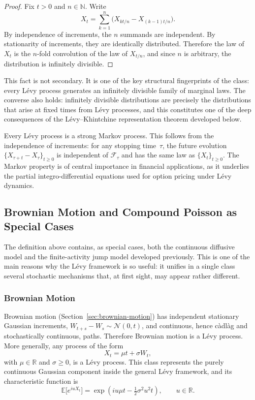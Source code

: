 \begin{proof}
Fix $t>0$ and $n\in\mathbb{N}$. Write
\[
X_t
=
\sum_{k=1}^{n}\bigl(X_{kt/n}-X_{(k-1)t/n}\bigr).
\]
By independence of increments, the $n$ summands are independent. By stationarity of increments, they are identically distributed. Therefore the law of $X_t$ is the $n$-fold convolution of the law of $X_{t/n}$, and since $n$ is arbitrary, the distribution is infinitely divisible.
\end{proof}

This fact is not secondary. It is one of the key structural fingerprints of the class: every L\'evy process generates an infinitely divisible family of marginal laws. The converse also holds: infinitely divisible distributions are precisely the distributions that arise at fixed times from L\'evy processes, and this constitutes one of the deep consequences of the L\'evy--Khintchine representation theorem developed below.

\begin{remark}
Every L\'evy process is a strong Markov process. This follows from the independence of increments: for any stopping time~$\tau$, the future evolution $\{X_{\tau+t}-X_\tau\}_{t\geq 0}$ is independent of $\mathcal{F}_\tau$ and has the same law as $\{X_t\}_{t\geq 0}$. The Markov property is of central importance in financial applications, as it underlies the partial integro-differential equations used for option pricing under L\'evy dynamics.
\end{remark}
\subsection{Brownian Motion and Compound Poisson as Special Cases}

The definition above contains, as special cases, both the continuous diffusive model and the finite-activity jump model developed previously. This is one of the main reasons why the L\'evy framework is so useful: it unifies in a single class several stochastic mechanisms that, at first sight, may appear rather different.
\subsubsection{Brownian Motion}

Brownian motion (Section~\ref{sec:brownian-motion}) has independent stationary Gaussian increments, $W_{t+s}-W_s\sim\mathcal{N}(0,t)$, and continuous, hence c\`adl\`ag and stochastically continuous, paths.
Therefore Brownian motion is a L\'evy process. More generally, any process of the form
\begin{equation}\label{eq:BM_levy}
X_t = \mu t + \sigma W_t,
\end{equation}
with $\mu\in\mathbb{R}$ and $\sigma\geq 0$, is a L\'evy process. This class represents the purely continuous Gaussian component inside the general L\'evy framework, and its characteristic function is
\begin{equation}\label{eq:BM_charfun}
\mathbb{E}\bigl[e^{iuX_t}\bigr] = \exp\!\left(iu\mu t - \tfrac{1}{2}\sigma^2 u^2 t\right), \qquad u\in\mathbb{R}.
\end{equation}
